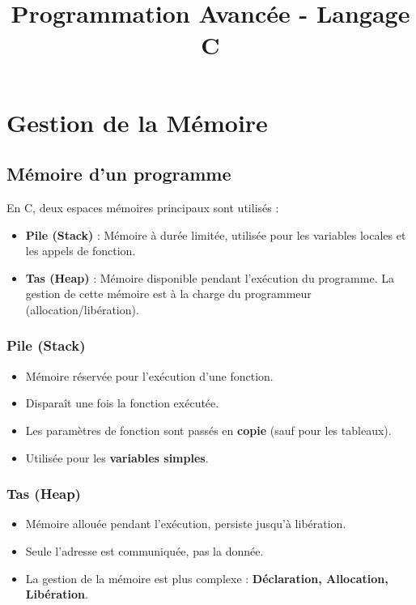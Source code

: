 \documentclass[french,11pt]{article}
\title{Programmation Avancée - Langage C}
\author{}
\date{}
\begin{document}
\maketitle
\tableofcontents

\section{Gestion de la Mémoire}

\subsection{Mémoire d’un programme}
En C, deux espaces mémoires principaux sont utilisés :
\begin{itemize}
    \item \textbf{Pile (Stack)} : Mémoire à durée limitée, utilisée pour les variables locales et les appels de fonction.
    \item \textbf{Tas (Heap)} : Mémoire disponible pendant l’exécution du programme. La gestion de cette mémoire est à la charge du programmeur (allocation/libération).
\end{itemize}

\subsubsection{Pile (Stack)}
\begin{itemize}
    \item Mémoire réservée pour l'exécution d'une fonction.
    \item Disparaît une fois la fonction exécutée.
    \item Les paramètres de fonction sont passés en \textbf{copie} (sauf pour les tableaux).
    \item Utilisée pour les \textbf{variables simples}.
\end{itemize}

\subsubsection{Tas (Heap)}
\begin{itemize}
    \item Mémoire allouée pendant l'exécution, persiste jusqu’à libération.
    \item Seule l’adresse est communiquée, pas la donnée.
    \item La gestion de la mémoire est plus complexe : \textbf{Déclaration, Allocation, Libération}.
\end{itemize}
\end{document}
